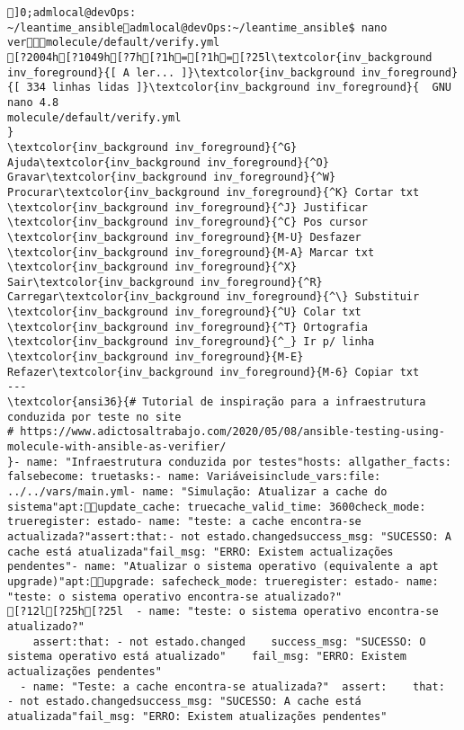 \documentclass{scrartcl}
\title{}
\begin{document}
\begin{Verbatim}
]0;admlocal@devOps: ~/leantime_ansibleadmlocal@devOps:~/leantime_ansible$ nano vermolecule/default/verify.yml 
[?2004h[?1049h[?7h[?1h=[?1h=[?25l\textcolor{inv_background inv_foreground}{[ A ler... ]}\textcolor{inv_background inv_foreground}{[ 334 linhas lidas ]}\textcolor{inv_background inv_foreground}{  GNU nano 4.8                                          molecule/default/verify.yml                                                       }
\textcolor{inv_background inv_foreground}{^G} Ajuda\textcolor{inv_background inv_foreground}{^O} Gravar\textcolor{inv_background inv_foreground}{^W} Procurar\textcolor{inv_background inv_foreground}{^K} Cortar txt    \textcolor{inv_background inv_foreground}{^J} Justificar    \textcolor{inv_background inv_foreground}{^C} Pos cursor    \textcolor{inv_background inv_foreground}{M-U} Desfazer     \textcolor{inv_background inv_foreground}{M-A} Marcar txt
\textcolor{inv_background inv_foreground}{^X} Sair\textcolor{inv_background inv_foreground}{^R} Carregar\textcolor{inv_background inv_foreground}{^\} Substituir    \textcolor{inv_background inv_foreground}{^U} Colar txt     \textcolor{inv_background inv_foreground}{^T} Ortografia    \textcolor{inv_background inv_foreground}{^_} Ir p/ linha   \textcolor{inv_background inv_foreground}{M-E} Refazer\textcolor{inv_background inv_foreground}{M-6} Copiar txt
---
\textcolor{ansi36}{# Tutorial de inspiração para a infraestrutura conduzida por teste no site
# https://www.adictosaltrabajo.com/2020/05/08/ansible-testing-using-molecule-with-ansible-as-verifier/
}- name: "Infraestrutura conduzida por testes"hosts: allgather_facts: falsebecome: truetasks:- name: Variáveisinclude_vars:file: ../../vars/main.yml- name: "Simulação: Atualizar a cache do sistema"apt:update_cache: truecache_valid_time: 3600check_mode: trueregister: estado- name: "teste: a cache encontra-se actualizada?"assert:that:- not estado.changedsuccess_msg: "SUCESSO: A cache está atualizada"fail_msg: "ERRO: Existem actualizações pendentes"- name: "Atualizar o sistema operativo (equivalente a apt upgrade)"apt:upgrade: safecheck_mode: trueregister: estado- name: "teste: o sistema operativo encontra-se atualizado?"
[?12l[?25h[?25l  - name: "teste: o sistema operativo encontra-se atualizado?"
    assert:that: - not estado.changed    success_msg: "SUCESSO: O sistema operativo está atualizado"    fail_msg: "ERRO: Existem actualizações pendentes"
  - name: "Teste: a cache encontra-se atualizada?"  assert:    that:  - not estado.changedsuccess_msg: "SUCESSO: A cache está atualizada"fail_msg: "ERRO: Existem atualizações pendentes"

\end{Verbatim}
\end{document}
